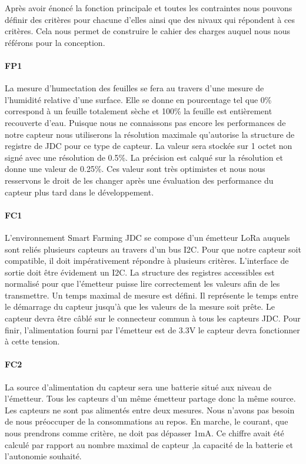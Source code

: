 Après avoir énoncé la fonction principale et toutes les contraintes nous pouvons définir des critères pour chacune d'elles ainsi que des nivaux qui répondent à ces critères. Cela nous permet de construire le cahier des charges auquel nous nous référons pour la conception. 

\paragraph{FP1}
La mesure d'humectation des feuilles se fera au travers d'une mesure de l'humidité relative d'une surface. Elle se donne en pourcentage tel que 0\% correspond à un feuille totalement sèche et 100\% la feuille est entièrement recouverte d'eau. Puisque nous ne connaissons pas encore les performances de notre capteur nous utiliserons la résolution maximale qu'autorise la structure de registre de JDC pour ce type de capteur. La valeur sera stockée sur 1 octet non signé avec une résolution de 0.5\%. La précision est calqué sur la résolution et donne une valeur de 0.25\%. Ces valeur sont très optimistes et nous nous resservons le droit de les changer après une évaluation des performance du capteur plus tard dans le développement. 

\paragraph{FC1} \label{fc1}
L’environnement Smart Farming JDC se compose d'un émetteur LoRa auquels sont reliés plusieurs capteurs au travers d'un bus I2C. Pour que notre capteur soit compatible, il doit impérativement répondre à plusieurs critères. L'interface de sortie doit être évidement un I2C. La structure des registres accessibles est normalisé pour que l’émetteur puisse lire correctement les valeurs afin de les transmettre. Un temps maximal de mesure est défini. Il représente le temps entre le démarrage du capteur jusqu'à que les valeurs de la mesure soit prête. Le capteur devra être câblé sur le connecteur commun à tous les capteurs JDC. Pour finir, l'alimentation fourni par l'émetteur est de 3.3V le capteur devra fonctionner à cette tension.

\paragraph{FC2}
La source d'alimentation du capteur sera une batterie situé aux niveau de l'émetteur. Tous les capteurs d'un même émetteur partage donc la même source. Les capteurs ne sont pas alimentés entre deux mesures. Nous n'avons pas besoin de nous préoccuper de la consommations au repos. En marche, le courant, que nous prendrons comme critère, ne doit pas dépasser 1mA. Ce chiffre avait été calculé par rapport au nombre maximal de capteur ,la capacité de la batterie et l'autonomie souhaité.  

